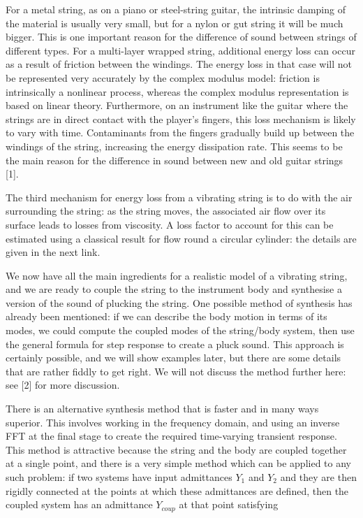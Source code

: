   For a metal string, as on a piano or steel-string guitar, the intrinsic 
  damping of the material is usually very small, but for a nylon or gut string 
  it will be much bigger. This is one important reason for the difference of 
  sound between strings of different types. For a multi-layer wrapped string, 
  additional energy loss can occur as a result of friction between the 
  windings. The energy loss in that case will not be represented very 
  accurately by the complex modulus model: friction is intrinsically a 
  nonlinear process, whereas the complex modulus representation is based on 
  linear theory. Furthermore, on an instrument like the guitar where the 
  strings are in direct contact with the player's fingers, this loss mechanism 
  is likely to vary with time. Contaminants from the fingers gradually build up 
  between the windings of the string, increasing the energy dissipation rate. 
  This seems to be the main reason for the difference in sound between new and 
  old guitar strings [1]. 

  The third mechanism for energy loss from a vibrating string is to do with the 
  air surrounding the string: as the string moves, the associated air flow over 
  its surface leads to losses from viscosity. A loss factor to account for this 
  can be estimated using a classical result for flow round a circular cylinder: 
  the details are given in the next link. 

  We now have all the main ingredients for a realistic model of a vibrating 
  string, and we are ready to couple the string to the instrument body and 
  synthesise a version of the sound of plucking the string. One possible method 
  of synthesis has already been mentioned: if we can describe the body motion 
  in terms of its modes, we could compute the coupled modes of the string/body 
  system, then use the general formula for step response to create a pluck 
  sound. This approach is certainly possible, and we will show examples later, 
  but there are some details that are rather fiddly to get right. We will not 
  discuss the method further here: see [2] for more discussion. 

  There is an alternative synthesis method that is faster and in many ways 
  superior. This involves working in the frequency domain, and using an inverse 
  FFT at the final stage to create the required time-varying transient 
  response. This method is attractive because the string and the body are 
  coupled together at a single point, and there is a very simple method which 
  can be applied to any such problem: if two systems have input admittances 
  $Y_1$ and $Y_2$ and they are then rigidly connected at the points at which 
  these admittances are defined, then the coupled system has an admittance 
  $Y_{coup}$ at that point satisfying 

